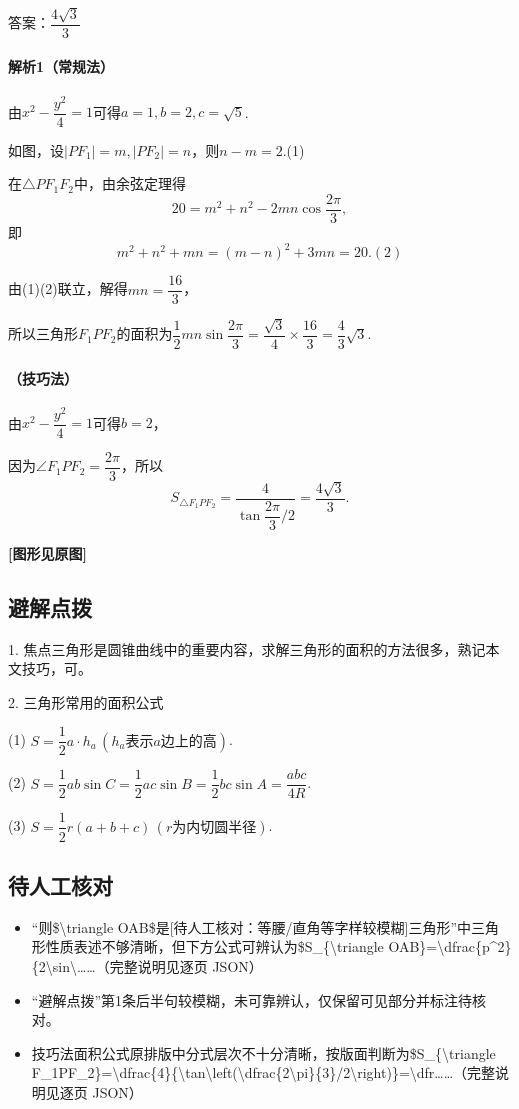 \documentclass[UTF8,a4paper,11pt]{ctexart}
\begin{document}
答案：$\dfrac{4\sqrt{3}}{3}$

\paragraph{解析1（常规法）}由$x^2-\dfrac{y^2}{4}=1$可得$a=1,b=2,c=\sqrt{5}$.

如图，设$|PF_1|=m,|PF_2|=n$，则$n-m=2$.(1)

在$\triangle PF_1F_2$中，由余弦定理得
\[
20=m^2+n^2-2mn\cos\dfrac{2\pi}{3},
\]
即
\[
m^2+n^2+mn=(m-n)^2+3mn=20.(2)
\]

由(1)(2)联立，解得$mn=\dfrac{16}{3}$，

所以三角形$F_1PF_2$的面积为$\dfrac{1}{2}mn\sin\dfrac{2\pi}{3}=\dfrac{\sqrt{3}}{4}\times\dfrac{16}{3}=\dfrac{4}{3}\sqrt{3}$.

\paragraph{（技巧法）}由$x^2-\dfrac{y^2}{4}=1$可得$b=2$，

因为$\angle F_1PF_2=\dfrac{2\pi}{3}$，所以
\[
S_{\triangle F_1PF_2}=\frac{4}{\tan\dfrac{2\pi}{3}/2}=\frac{4\sqrt{3}}{3}.
\]

\textbf{[图形见原图]}

\subsection*{避解点拨}
1. 焦点三角形是圆锥曲线中的重要内容，求解三角形的面积的方法很多，熟记本文技巧，可\newline
[待人工核对]。

2. 三角形常用的面积公式

(1) $S=\dfrac{1}{2}a\cdot h_a\,(h_a\text{表示}a\text{边上的高})$.

(2) $S=\dfrac{1}{2}ab\sin C=\dfrac{1}{2}ac\sin B=\dfrac{1}{2}bc\sin A=\dfrac{abc}{4R}$.

(3) $S=\dfrac{1}{2}r(a+b+c)\,(r\text{为内切圆半径})$.

\subsection*{待人工核对}

\begin{itemize}

\item “则\$\textbackslash{}triangle OAB\$是[待人工核对：等腰/直角等字样较模糊]三角形”中三角形性质表述不够清晰，但下方公式可辨认为\$S\_\{\textbackslash{}triangle OAB\}=\textbackslash{}dfrac\{p\textasciicircum{}2\}\{2\textbackslash{}sin\textbackslash{}……（完整说明见逐页 JSON）

\item “避解点拨”第1条后半句较模糊，未可靠辨认，仅保留可见部分并标注待核对。

\item 技巧法面积公式原排版中分式层次不十分清晰，按版面判断为\$S\_\{\textbackslash{}triangle F\_1PF\_2\}=\textbackslash{}dfrac\{4\}\{\textbackslash{}tan\textbackslash{}left(\textbackslash{}dfrac\{2\textbackslash{}pi\}\{3\}/2\textbackslash{}right)\}=\textbackslash{}dfr……（完整说明见逐页 JSON）

\end{itemize}
\end{document}
